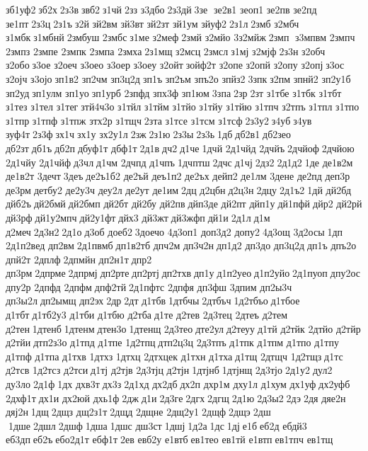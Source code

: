 зб1уф2 зб2х 2з3в звб2 з1чй 2зз 	з3дбо 2з3дй 3зе  зе2в1 	зеоп1 	зе2пв 	зе2пд 	зе1пт 2з3ц 2з1ъ з2й 	зй2вм 	зй3вт 	зй2зт 	зй1ум 	зйуф2 2з1л 2змб  	з2мбч 	з1мбк з1мбнй 2змбуш 	2змбс з1ме 	з2меф 2змй  	з2мйо 
3з2мйж 2змп  з3мпвм 	2змпч 	2змпз 	2змпе 	2змпк 	2змпа 	2змха 2з1мщ 	з2мсц 	2змсл з1мј 	з2мјф 2з3н 	з2обч 	з2обо з3ое  	з2оеч 	з3оео 	з3оер 	з3оеу 	з2ойт зойф2т 	з2опе 	з2опй 	з2опу 	з2опј з3ос 	з2ојч 	з3ојо зп1в2 	зп2чм 
зп3ц2д зп1ъ 	зп2ъм 	зпъ2о 	зпйз2 3зпк з2пм 	зпнй2 
зп2у1б 	зп2уд зп1улм 	зп1уо зп1урб 	2зпфд 	зпх3ф 	зп1юм 3зпа 2зр 2зт  	з1тбе 	з1тбк 	з1тбт 	з1тез 	з1тел 	з1тег зтй4ч3о 	з1тйл 	з1тйм 	з1тйо 	з1тйу 	з1тйю 	з1тпч 	з2тпъ 	з1тпл 	з1тпо 	з1тпр 	з1тпф 	з1тпж 	зтх2р 	з1тщч 2зта 	з1тсе 	з1тсм 	з1тсф 2з3у2 з4уб з4ув 	зуф4т 2з3ф зх1ч зх1у 
зх2у1л 2зж 2з1ю 2з3ы 2з3ь 1дб дб2в1 дб2зео 	дб2зт дб1ъ дб2п дбуф1т 	дбф1т 2д1в дч2 д1че 1дчй 
2д1чйд 	2дчйъ 2дчйоф 2дчйою 
2д1чйу 
2д1чйф д3чл д1чм 	2дчпд 	д1чпъ 1дчптш 2дчс д1чј 2дз2 2д1д2 1де 
де1в2м 
де1в2т 	3дечт 3деъ де2ъ1б2 	де2ъй 
деъ1п2 	де2ъх 	дейп2 	де1лм 	3дене 	де2пд 	деп3р 	де3рм детбу2 
де2у3ч 	деу2л 	де2ут 	де1им 2дц  	д2цбн д2ц3н 2дцу 2д1ъ2 1дй 	дй2бд 	дйб2ъ дй2бмй дй2бмп 	дй2бт 	дй2бу 	дй2пв дйп3де 	дй2пт 	дйп1у дй1пфй дйр2 	дй2рй 	дй3рф дй1у2мпч дй2у1фт дйх3 	дй3жт дй3жфп дй1и 2д1л д1м 	д2меч 2д3н2 2д1о д3об 	доеб2 3доечо 	4д3оп1 
доп3д2 	допу2 4д3ощ 
3д2осы 1дп 
2д1п2вед 	дп2вм 2д1пвмб дп1в2тб 	дпч2м 
дп3ч2н дп1д2 	дп3до 
дп3ц2д дп1ъ 	дпъ2о 	дпй2т 	2дплф 2дпмйн 
дп2н1т дпр2 	дп3рм 2дпрме 2дпрмј дп2рте дп2ртј дп2тхв дп1у д1п2уео д1п2уйо 2д1пуоп дпу2ос 	дпу2р 	2дпфд 	2дпфм дпф2тй 2д1пфтс 	2дпфя 	дп3фш 	3дпим 
дп2ы3ч 
дп3ы2л дп2ымщ 	дп2эх 2др 2дт  	д1тбв 1дтбчы 2дтбъч 1д2тбъо д1тбое 	д1тбт д1тб2у3 	д1тби 	д1тбю 	д2тба д1те 	д2тев 
2д3тец 	2дтеъ 	д2тем 	д2тен 1дтенб 1дтенм дтен3о 1дтенщ 
2д3тео дте2ул д2теуу д1тй 	д2тйк 	2дтйо 	д2тйр 	д2тйи дтп2з3о 	д1тпд 	д1тпе 
1д2тпц дтп2ц3ц 
2д3тпъ 	д1тпк 	д1тпм 	д1тпо 	д1тпу 	д1тпф 	д1тпа 	д1тхв 	1дтхз 	1дтхц 
2дтхцек 	д1тхн 	д1тха д1тщ 	2дтщч 
1д2тщз д1тс 	д2тсв 
1д2тсз 	д2тси д1тј 	д2тјв 
2д3тјц 	д2тјн 1дтјнб 1дтјнщ 
2д3тјо 2д1у2 дул2 	ду3ло 2д1ф 1дх 	дхв3т дх3з 2д1хд 	дх2дб дх2п 	дхр1м 	дху1л 	д1хум 	дх1уф дх2уфб 
2дхф1т дх1и 	дх2юй 	дхь1ф 2дж д1и 2д3ге 2дгх 2дгщ 2д1ю 2д3ы2 2дэ 2дя 	дяе2н 	дяј2н 1дщ 2дщз 
дщ2з1т 2дщд 	2дщне 	2дщ2у1 2дщф 2дщэ 2дш  1дше 2дшл 2дшф 1дша 1дшс 	дш3ст 1дшј 1д2а 1дс 1дј е1б еб2д 	ебдй3 	еб3дп еб2ъ ебо2д1т 	ебф1т 2ев 	евб2у 	е1втб ев1тео 	ев1тй 	е1втп ев1тпч 	ев1тщ 
